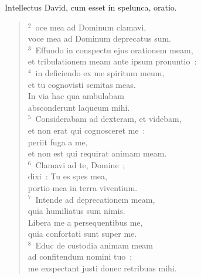 \bchapter[Psalm]
Intellectus David, cum esset in spelunca, oratio.
\begin{verse}${}^{2}$~oce mea ad Dominum clamavi,\\ voce mea ad Dominum deprecatus sum.\\
${}^{3}$~Effundo in conspectu ejus orationem meam,\\ et tribulationem meam ante ipsum pronuntio~:\\
${}^{4}$~in deficiendo ex me spiritum meum,\\ et tu cognovisti semitas meas.\\ In via hac qua ambulabam\\ absconderunt laqueum mihi.\\
${}^{5}$~Considerabam ad dexteram, et videbam,\\ et non erat qui cognosceret me~:\\ periit fuga a me,\\ et non est qui requirat animam meam.\\
${}^{6}$~Clamavi ad te, Domine~;\\ dixi~: Tu es spes mea,\\ portio mea in terra viventium.\\
${}^{7}$~Intende ad deprecationem meam,\\ quia humiliatus sum nimis.\\ Libera me a persequentibus me,\\ quia confortati sunt super me.\\
${}^{8}$~Educ de custodia animam meam\\ ad confitendum nomini tuo~;\\ me exspectant justi donec retribuas mihi.\end{verse}



